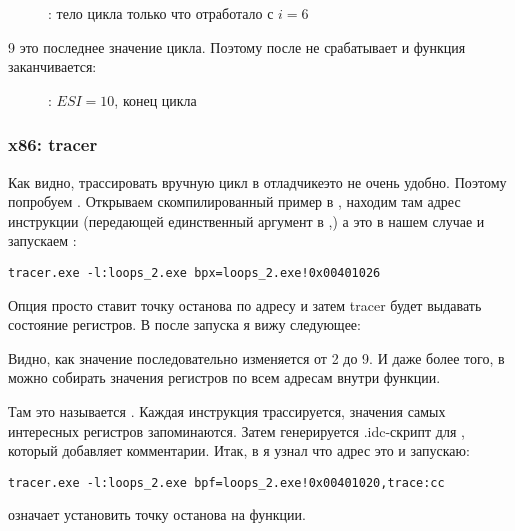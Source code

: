 \begin{figure}[H]
\centering
{}
\caption{\olly: тело цикла только что отработало с $i=6$}
\label{fig:loops_olly_2}
\end{figure}

9 это последнее значение цикла.
Поэтому \JL после  не срабатывает и функция заканчивается:

\begin{figure}[H]
\centering
{}
\caption{\olly: $ESI=10$, конец цикла}
\label{fig:loops_olly_3}
\end{figure}

\subsubsection{x86: tracer}

Как видно, трассировать вручную цикл в отладчике\EMDASH{}это не очень удобно.
Поэтому попробуем \tracer.
Открываем скомпилированный пример в \IDA, находим там адрес инструкции 
(передающей единственный аргумент в \ttf,)
а это  в нашем случае и запускаем \tracer:

\begin{lstlisting}
tracer.exe -l:loops_2.exe bpx=loops_2.exe!0x00401026
\end{lstlisting}

Опция  просто ставит точку останова по адресу и затем tracer будет выдавать состояние регистров.
В  после запуска я вижу следующее:



Видно, как значение \ESI последовательно изменяется от 2 до 9.
И даже более того, в \tracer можно собирать значения регистров по всем адресам внутри функции.

Там это называется .
Каждая инструкция трассируется, значения самых интересных регистров запоминаются.
Затем генерируется .idc-скрипт для \IDA, который добавляет комментарии.
Итак, в \IDA я узнал что адрес \main это  и запускаю:

\begin{lstlisting}
tracer.exe -l:loops_2.exe bpf=loops_2.exe!0x00401020,trace:cc
\end{lstlisting}

 означает установить точку останова на функции.

